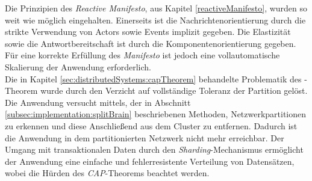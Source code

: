 Die Prinzipien des \textit{Reactive Manifesto}, aus Kapitel \ref{reactiveManifesto}, wurden so weit wie möglich eingehalten. Einerseits ist die Nachrichtenorientierung durch die strikte Verwendung von Actors sowie Events implizit gegeben. Die Elastizität sowie die Antwortbereitschaft ist durch die Komponentenorientierung gegeben. Für eine korrekte Erfüllung des \textit{Manifesto} ist jedoch eine vollautomatische Skalierung der Anwendung erforderlich. \\
Die in Kapitel \ref{sec:distributedSystems:capTheorem} behandelte Problematik des -Theorem wurde durch den Verzicht auf vollständige Toleranz der Partition gelöst. Die Anwendung versucht mittels, der in Abschnitt 
\ref{subsec:implementation:splitBrain} beschriebenen Methoden, Netzwerkpartitionen zu erkennen und diese Anschließend aus dem Cluster zu entfernen. Dadurch ist die Anwendung in dem partitionierten Netzwerk nicht mehr erreichbar. Der Umgang mit transaktionalen Daten durch den \textit{Sharding}-Mechanismus ermöglicht der Anwendung eine einfache und fehlerresistente Verteilung von Datensätzen, wobei die Hürden des \textit{CAP}-Theorems beachtet werden.


